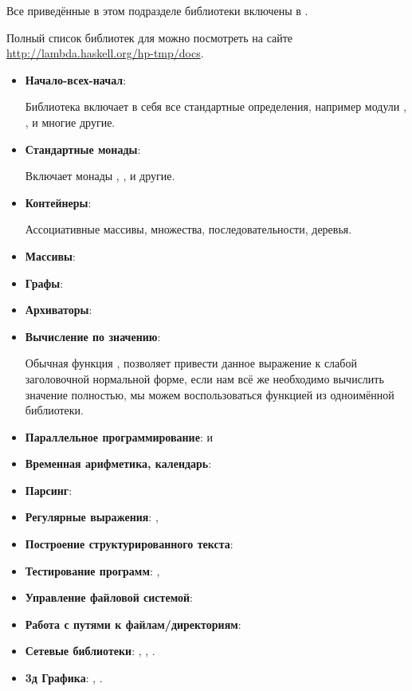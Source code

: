 
Все приведённые в этом подразделе библиотеки включены
в .

Полный список библиотек для 
можно посмотреть на сайте \url{http://lambda.haskell.org/hp-tmp/docs}.

\begin{itemize}
\item \textbf{Начало-всех-начал}: 

    Библиотека включает в себя все стандартные определения,
    например модули , , 
    и многие другие.

\item \textbf{Стандартные монады}:  

    Включает монады , , 
    и другие.
    

\item \textbf{Контейнеры}: 

    Ассоциативные массивы, множества, последовательности, деревья. 

\item \textbf{Массивы}: 

\item \textbf{Графы}: 

\item \textbf{Архиваторы}: 
\item \textbf{Вычисление по значению}: 
    
    Обычная функция , позволяет привести данное
    выражение к слабой заголовочной нормальной форме,
    если нам всё же необходимо вычислить значение полностью,
    мы можем воспользоваться функцией  из 
    одноимённой библиотеки.

\item \textbf{Параллельное программирование}:  и 

\item \textbf{Временная арифметика, календарь}: 
\item \textbf{Парсинг}: 
\item \textbf{Регулярные выражения}: , 
\item \textbf{Построение структурированного текста}: 
\item \textbf{Тестирование программ}: , 
\item \textbf{Управление файловой системой}: 
\item \textbf{Работа с путями к файлам/директориям}: 
\item \textbf{Сетевые библиотеки}: , , .
\item \textbf{3д Графика}: , .


\end{itemize}
